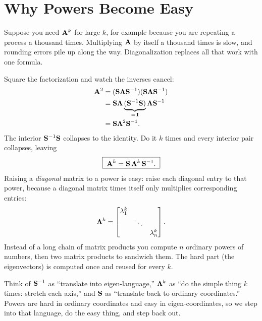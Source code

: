\section{Why Powers Become Easy}
\label{ch24:powers}

Suppose you need $\mathbf{A}^k$ for large $k$, for example because you are
repeating a process a thousand times. Multiplying $\mathbf{A}$ by itself a thousand
times is slow, and rounding errors pile up along the way. Diagonalization
replaces all that work with one formula.

Square the factorization and watch the inverses cancel:
\begin{align*}
  \mathbf{A}^2
  &= (\mathbf{S}\mathbf{\Lambda}\mathbf{S}^{-1})(\mathbf{S}\mathbf{\Lambda}\mathbf{S}^{-1}) \\
  &= \mathbf{S}\mathbf{\Lambda}\underbrace{(\mathbf{S}^{-1}\mathbf{S})}_{=\,\mathbf{I}}\mathbf{\Lambda}\mathbf{S}^{-1} \\
  &= \mathbf{S}\mathbf{\Lambda}^2\mathbf{S}^{-1}.
\end{align*}
The interior $\mathbf{S}^{-1}\mathbf{S}$ collapses to the identity. Do it $k$ times and
every interior pair collapses, leaving
\[
  \boxed{\;\mathbf{A}^k = \mathbf{S}\,\mathbf{\Lambda}^k\,\mathbf{S}^{-1}.\;}
\]
Raising a \emph{diagonal} matrix to a power is easy: raise each
diagonal entry to that power, because a diagonal matrix times itself only
multiplies corresponding entries:
\[
  \mathbf{\Lambda}^k
  = \begin{bmatrix} \lambda_1^k & & \\ & \ddots & \\ & & \lambda_n^k \end{bmatrix}.
\]
Instead of a long chain of matrix products you compute $n$ ordinary powers of
numbers, then two matrix products to sandwich them. The hard part (the eigenvectors) is computed once
and reused for every $k$.

\begin{intuitionbox}
Think of $\mathbf{S}^{-1}$ as ``translate into eigen-language,'' $\mathbf{\Lambda}^k$ as
``do the simple thing $k$ times: stretch each axis,'' and $\mathbf{S}$ as
``translate back to ordinary coordinates.'' Powers are hard in ordinary
coordinates and easy in eigen-coordinates, so we step into that language, do
the easy thing, and step back out.
\end{intuitionbox}

